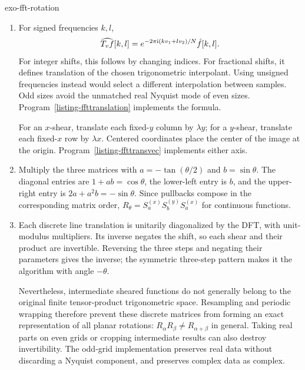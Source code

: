 \begin{correction}{exo-fft-rotation}
\begin{enumerate}
\item For signed frequencies $k,l$,
\[
 \widehat{T_vf}[k,l]=e^{-2\pi\mathrm{i}(kv_1+lv_2)/N}\hat{f}[k,l].
\]
For integer shifts, this follows by changing indices. For fractional shifts,
it defines translation of the chosen trigonometric interpolant. Using
unsigned frequencies instead would select a different interpolation between
samples. Odd sizes avoid the unmatched real Nyquist mode of even sizes.
Program~\ref{listing-ffttranslation} implements the formula.
\begin{listing}[H]
\caption{Fractional translation using signed Fourier frequencies.}
\label{listing-ffttranslation}
\end{listing}
For an $x$-shear, translate each fixed-$y$ column by $\lambda y$; for a
$y$-shear, translate each fixed-$x$ row by $\lambda x$. Centered coordinates
place the center of the image at the origin.
Program~\ref{listing-ffttransvec} implements either axis.
\begin{listing}[H]
\caption{A centered shear along either image coordinate.}
\label{listing-ffttransvec}
\end{listing}
\item Multiply the three matrices with
$a=-\tan(\theta/2)$ and $b=\sin\theta$. The diagonal entries are
$1+ab=\cos\theta$, the lower-left entry is $b$, and the upper-right entry
is $2a+a^2b=-\sin\theta$. Since pullbacks compose in the corresponding
matrix order,
$R_\theta=S_a^{(x)}S_b^{(y)}S_a^{(x)}$ for continuous functions.
\item Each discrete line translation is unitarily diagonalized by the DFT,
with unit-modulus multipliers. Its inverse negates the shift, so each shear
and their product are invertible. Reversing the three steps and negating
their parameters gives the inverse; the symmetric three-step pattern makes
it the algorithm with angle $-\theta$.
\begin{listing}[H]
\caption{Rotation by three discrete shears.}
\label{listing-fftrotation}
\end{listing}
Nevertheless, intermediate sheared functions do not generally belong to
the original finite tensor-product trigonometric space. Resampling and
periodic wrapping therefore prevent these discrete matrices from forming
an exact representation of all planar rotations:
$R_\alpha R_\beta\ne R_{\alpha+\beta}$ in general.
Taking real parts on even grids or cropping intermediate results can also
destroy invertibility. The odd-grid implementation preserves real data
without discarding a Nyquist component, and preserves complex data as complex.


\end{enumerate}
\end{correction}
